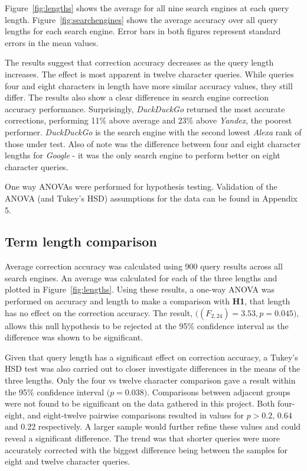 \documentclass{csfourzero}
\begin{document}
Figure~\ref{fig:lengths} shows the average for all nine search engines at each query length. Figure~\ref{fig:searchengines} shows the average accuracy over all query lengths for each search engine. Error bars in both figures represent standard errors in the mean values.

The results suggest that correction accuracy decreases as the query length increases. The effect is most apparent in twelve character queries. While queries four and eight characters in length have more similar accuracy values, they still differ. The results also show a clear difference in search engine correction accuracy performance. Surprisingly, \textit{DuckDuckGo} returned the most accurate corrections, performing 11\% above average and 23\% above \textit{Yandex}, the poorest performer. \textit{DuckDuckGo} is the search engine with the second lowest \textit{Alexa} rank of those under test. Also of note was the difference between four and eight character lengths for \textit{Google} - it was the only search engine to perform better on eight character queries.

One way ANOVAs were performed for hypothesis testing. Validation of the ANOVA (and Tukey's HSD) assumptions for the data can be found in Appendix 5.

\subsection{Term length comparison}
Average correction accuracy was calculated using 900 query results across all search engines. An average was calculated for each of the three lengths and plotted in Figure~\ref{fig:lengths}. Using these results, a one-way ANOVA was performed on accuracy and length to make a comparison with \textbf{H1}, that length has no effect on the correction accuracy. The result, $\big((F_{2,24}) = 3.53, p = 0.045\big)$, allows this null hypothesis to be rejected at the 95\% confidence interval as the difference was shown to be significant.

Given that query length has a significant effect on correction accuracy, a Tukey's HSD test was also carried out to closer investigate differences in the means of the three lengths. Only the four vs twelve character comparison gave a result within the 95\% confidence interval $\big(p = 0.038\big)$. Comparisons between adjacent groups were not found to be significant on the data gathered in this project. Both four-eight, and eight-twelve pairwise comparisons resulted in values for $p > 0.2$, $0.64$ and $0.22$ respectively. A larger sample would further refine these values and could reveal a significant difference. The trend was that shorter queries were more accurately corrected with the biggest difference being between the samples for eight and twelve character queries.
\end{document}
